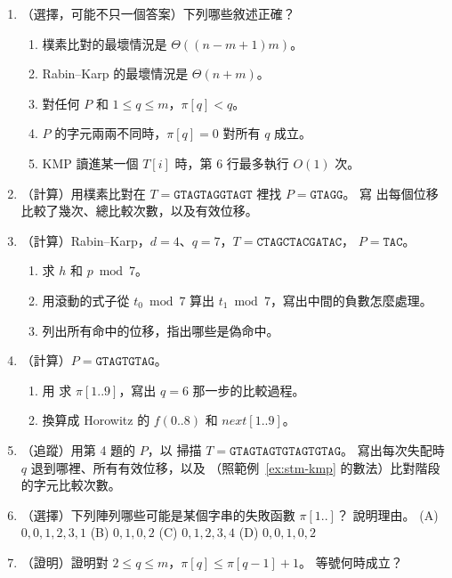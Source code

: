 \begin{enumerate}
\item （選擇，可能不只一個答案）下列哪些敘述正確？
\begin{enumerate}
\item 樸素比對的最壞情況是 $\Theta((n - m + 1)m)$。
\item Rabin--Karp 的最壞情況是 $\Theta(n + m)$。
\item 對任何 $P$ 和 $1 \le q \le m$，$\pi[q] < q$。
\item $P$ 的字元兩兩不同時，$\pi[q] = 0$ 對所有 $q$ 成立。
\item KMP 讀進某一個 $T[i]$ 時，第 6 行最多執行 $O(1)$ 次。
\end{enumerate}

\item （計算）用樸素比對在 $T = \mathtt{GTAGTAGGTAGT}$ 裡找 $P = \mathtt{GTAGG}$。 寫
出每個位移比較了幾次、總比較次數，以及有效位移。

\item （計算）Rabin--Karp，$d = 4$、$q = 7$，$T = \mathtt{CTAGCTACGATAC}$，
$P = \mathtt{TAC}$。
\begin{enumerate}
\item 求 $h$ 和 $p \bmod 7$。
\item 用滾動的式子從 $t_0 \bmod 7$ 算出 $t_1 \bmod 7$，寫出中間的負數怎麼處理。
\item 列出所有命中的位移，指出哪些是偽命中。
\end{enumerate}

\item （計算）$P = \mathtt{GTAGTGTAG}$。
\begin{enumerate}
\item 用  求 $\pi[1..9]$，寫出 $q = 6$ 那一步的比較過程。
\item 換算成 Horowitz 的 $f(0..8)$ 和 $\mathit{next}[1..9]$。
\end{enumerate}

\item （追蹤）用第 4 題的 $P$，以  掃描
$T = \mathtt{GTAGTAGTGTAGTGTAG}$。 寫出每次失配時 $q$ 退到哪裡、所有有效位移，以及
（照範例~\ref{ex:stm-kmp} 的數法）比對階段的字元比較次數。

\item （選擇）下列陣列哪些可能是某個字串的失敗函數 $\pi[1..]$？ 說明理由。
(A) $0, 0, 1, 2, 3, 1$ \quad (B) $0, 1, 0, 2$ \quad (C) $0, 1, 2, 3, 4$ \quad
(D) $0, 0, 1, 0, 2$

\item （證明）證明對 $2 \le q \le m$，$\pi[q] \le \pi[q - 1] + 1$。 等號何時成立？


\end{enumerate}
